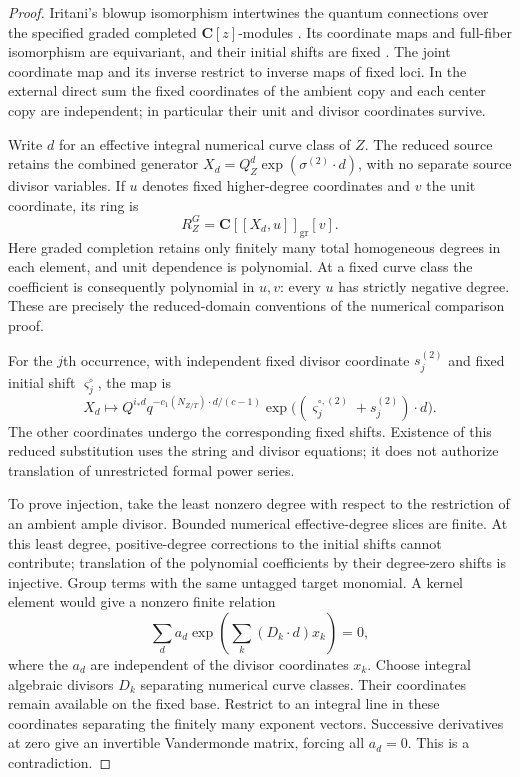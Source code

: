 \documentclass[11pt]{article}
\newcommand{\C}{\mathbf C}
\begin{document}
\begin{proof}
Iritani's blowup isomorphism intertwines the quantum connections over the
specified graded completed $\C[z]$-modules
\cite[Theorem~5.18 and Section~5.8.2]{IB}. Its coordinate maps and full-fiber
isomorphism are equivariant, and their initial shifts are fixed
\cite[Proposition~8 and Lemma~10]{IH}. The joint coordinate map and its
inverse restrict to inverse maps of fixed loci. In the external direct
sum the fixed coordinates of the ambient copy and each center copy are
independent; in particular their unit and divisor coordinates survive.

Write $d$ for an effective integral numerical curve class of $Z$. The
reduced source retains the combined generator
$X_d=Q_Z^d\exp(\sigma^{(2)}\cdot d)$, with no separate source divisor
variables. If $u$ denotes fixed higher-degree coordinates and $v$ the unit
coordinate, its ring is
\[
 R_Z^G=\C[[X_d,u]]_{\mathrm{gr}}[v].
\]
Here graded completion retains only finitely many total homogeneous
degrees in each element, and unit dependence is polynomial. At a fixed
curve class the coefficient is consequently polynomial in $u,v$: every
$u$ has strictly negative degree. These are precisely the reduced-domain
conventions of the numerical comparison proof.

For the $j$th occurrence, with independent fixed divisor coordinate
$s_j^{(2)}$ and fixed initial shift $\varsigma_j^\circ$, the map is
\[
 X_d\longmapsto Q^{i_*d}
 q^{-c_1(N_{Z/T})\cdot d/(c-1)}
 \exp\bigl((\varsigma_j^{\circ,(2)}+s_j^{(2)})\cdot d\bigr).
\]
The other coordinates undergo the corresponding fixed shifts. Existence
of this reduced substitution uses the string and divisor equations; it
does not authorize translation of unrestricted formal power series.

To prove injection, take the least nonzero degree with respect to the
restriction of an ambient ample divisor. Bounded numerical effective-degree
slices are finite. At this least degree, positive-degree corrections to
the initial shifts cannot contribute; translation of the polynomial
coefficients by their degree-zero shifts is injective. Group terms with
the same untagged target monomial. A kernel element would give a nonzero
finite relation
\[
 \sum_d a_d\exp\!\left(\sum_k(D_k\cdot d)x_k\right)=0,
\]
where the $a_d$ are independent of the divisor coordinates $x_k$.
Choose integral algebraic divisors $D_k$ separating numerical curve
classes. Their coordinates remain available on the fixed base. Restrict
to an integral line in these coordinates separating the finitely many
exponent vectors. Successive derivatives at zero give an invertible
Vandermonde matrix, forcing all $a_d=0$. This is a contradiction.


\end{proof}
\end{document}
